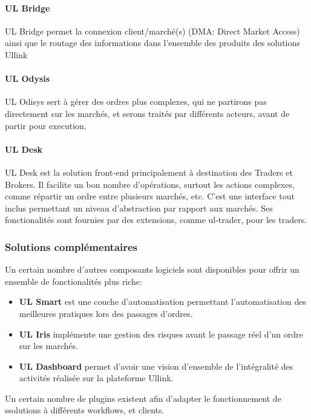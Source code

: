 \documentclass[a4paper, 12pt]{article}
\begin{document}
\paragraph{UL Bridge}

UL Bridge permet la connexion client/marché(s) (DMA: Direct Market Access) ainsi que le routage des informations dans l'ensemble des produits des solutions Ullink

\paragraph{UL Odysis}

UL Odisys sert à gérer des ordres plus complexes, qui ne partirons pas directement sur les marchés, et serons traités par différents acteurs, avant de partir pour execution.

\paragraph{UL Desk}
UL Desk est la solution front-end principalement à destination des Traders et Brokers. Il facilite un bon nombre d'opérations, surtout les actions complexes, comme répartir un ordre entre plusieurs marchés, etc. C'est une interface tout inclus permettant un niveau d'abstraction par rapport aux marchés. Ses fonctionalités sont fournies par des extensions, comme ul-trader, pour les traders.

\subsubsection{Solutions complémentaires}
Un certain nombre d'autres composants logiciels sont disponibles pour offrir un ensemble de fonctionalités plus riche:

\begin{itemize}
\item{{\bf UL Smart} est une couche d'automatisation permettant l'automatisation des meilleures pratiques lors des passages d'ordres.}
\item{{\bf UL Iris} implémente une gestion des risques avant le passage réel d'un ordre sur les marchés.}
\item{{\bf UL Dashboard} permet d'avoir une vision d'ensemble de l'intégralité des activités réalisée sur la plateforme Ullink.}
\end{itemize}

Un certain nombre de plugins existent afin d'adapter le fonctionnement de ssolutions à différents workflows, et clients.
\end{document}
